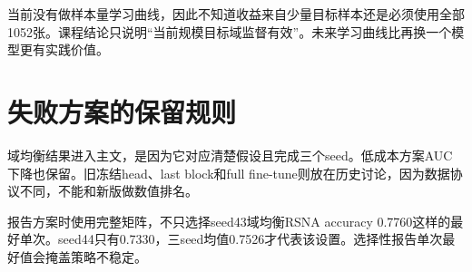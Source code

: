 当前没有做样本量学习曲线，因此不知道收益来自少量目标样本还是必须使用全部1052张。课程结论只说明“当前规模目标域监督有效”。未来学习曲线比再换一个模型更有实践价值。

\section{失败方案的保留规则}

域均衡结果进入主文，是因为它对应清楚假设且完成三个seed。低成本方案AUC下降也保留。旧冻结head、last block和full fine-tune则放在历史讨论，因为数据协议不同，不能和新版做数值排名。

报告方案时使用完整矩阵，不只选择seed43域均衡RSNA accuracy 0.7760这样的最好单次。seed44只有0.7330，三seed均值0.7526才代表该设置。选择性报告单次最好值会掩盖策略不稳定。
